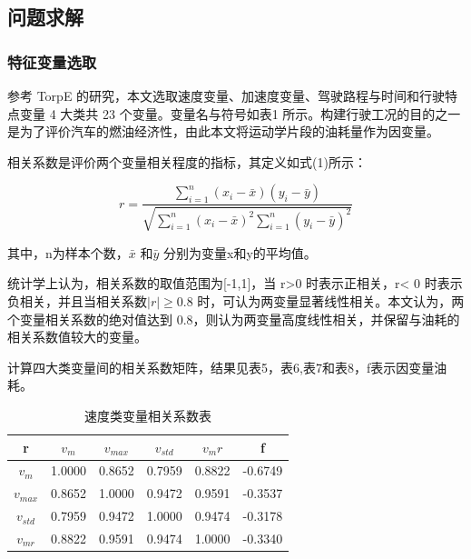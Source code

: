 \documentclass[bwprint]{gmcmthesis}
\begin{document}
\subsection{问题求解}
\subsubsection{特征变量选取}
参考 TorpE 的研究，本文选取速度变量、加速度变量、驾驶路程与时间和行驶特点变量 4 大类共 23 个变量\cite{c5}。变量名与符号如表1 所示。构建行驶工况的目的之一是为了评价汽车的燃油经济性，由此本文将运动学片段的油耗量作为因变量。

相关系数是评价两个变量相关程度的指标，其定义如式(1)所示：

\begin{equation}
r=\frac{\sum\limits^n_{i=1}(x_i-\bar x)(y_i-\bar y)}{\sqrt{\sum\limits^n_{i=1}(x_i-\bar x)^2\sum\limits^n_{i=1}(y_i-\bar y)^2}}
\end{equation}

其中，n为样本个数，$\bar x$ 和$\bar y$ 分别为变量x和y的平均值。

统计学上认为，相关系数的取值范围为[-1,1]，当 r>0 时表示正相关，r< 0 时表示负相关，并且当相关系数$|r|\geq 0.8$ 时，可认为两变量显著线性相关。本文认为，两个变量相关系数的绝对值达到 0.8，则认为两变量高度线性相关，并保留与油耗的相关系数值较大的变量。

计算四大类变量间的相关系数矩阵，结果见表5，表6,表7和表8，f表示因变量油耗。
\begin{table}[htbp]
\caption{速度类变量相关系数表}
\centering
\begin{tabular}{c c c c c c}%
\hline  %
r           & $v_m$	& $v_{max}$	& $v_{std}$ & $v_mr$	& f\\
\hline
$v_m$    &	1.0000&	0.8652	&0.7959	&0.8822&-0.6749\\
$v_{max}$ &	0.8652	&1.0000&	0.9472	&0.9591&	-0.3537\\
$v_{std}$ &0.7959	&0.9472&	1.0000&	0.9474&	-0.3178\\
$v_{mr}$	&0.8822	&0.9591&	0.9474&	1.0000&	-0.3340\\

\hline  %
\end{tabular}
\end{table}
\end{document}
